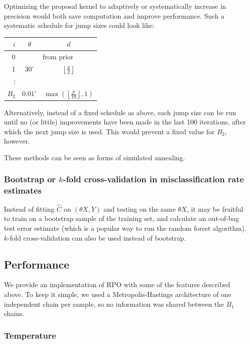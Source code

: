 \documentclass{amsart}
\begin{document}
Optimizing the proposal kernel to adaptively or systematically increase in precision would both save computation and improve performance. Such a systematic schedule for jump sizes could look like:

\vspace{6pt}
\begin{center}
	\begin{tabular}{r|cc}
		$i$ & $\theta$ & $d$ \\
		\hline
		0 & \multicolumn{2}{c}{from prior} \\
		1 & $30^\circ$ & $\left\lfloor\frac{p}{2}\right\rfloor$ \\
		$\vdots$ & & \\
		$B_2$ & $0.01^\circ$ & $\max\left(\left\lfloor\frac{p}{10}\right\rfloor, 1\right)$
	\end{tabular}
\end{center}
\vspace{6pt}

Alternatively, instead of a fixed schedule as above, each jump size can be run until no (or little) improvements have been made in the last 100 iterations, after which the next jump size is used. This would prevent a fixed value for $B_2$, however.

These methods can be seen as forms of simulated annealing.

\subsubsection{Bootstrap or $k$-fold cross-validation in misclassification rate estimates}

Instead of fitting $\hat C$ on $(\theta X, Y)$ and testing on the same $\theta X$, it may be fruitful to train on a bootstrap sample of the training set, and calculate an out-of-bag test error estimate (which is a popular way to run the random forest algorithm). $k$-fold cross-validation can also be used instead of bootstrap.

\subsection{Performance}

We provide an implementation of RPO with some of the features described above. To keep it simple, we used a Metropolis-Hastings architecture of one independent chain per sample, so no information was shared between the $B_1$ chains.

\subsubsection{Temperature}
\end{document}
